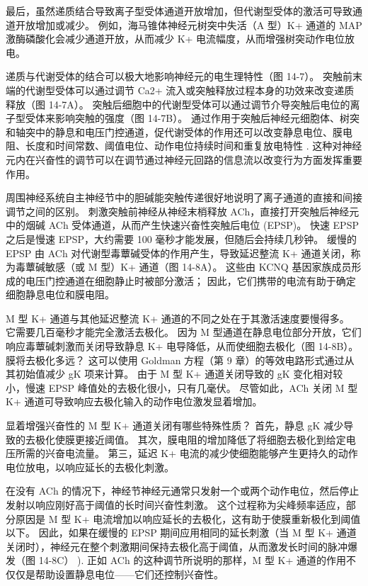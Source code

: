 最后，虽然递质结合导致离子型受体通道开放增加，但代谢型受体的激活可导致通道开放增加或减少。 例如，海马锥体神经元树突中失活（A 型）K+ 通道的 MAP 激酶磷酸化会减少通道开放，从而减少 K+ 电流幅度，从而增强树突动作电位放电。

递质与代谢受体的结合可以极大地影响神经元的电生理特性（图 14-7）。 突触前末端的代谢型受体可以通过调节 Ca2+ 流入或突触释放过程本身的功效来改变递质释放（图 14-7A）。 突触后细胞中的代谢型受体可以通过调节介导突触后电位的离子型受体来影响突触的强度（图 14-7B）。 通过作用于突触后神经元细胞体、树突和轴突中的静息和电压门控通道，促代谢受体的作用还可以改变静息电位、膜电阻、长度和时间常数、阈值电位、动作电位持续时间和重复放电特性 . 这种对神经元内在兴奋性的调节可以在调节通过神经元回路的信息流以改变行为方面发挥重要作用。

周围神经系统自主神经节中的胆碱能突触传递很好地说明了离子通道的直接和间接调节之间的区别。 刺激突触前神经从神经末梢释放 ACh，直接打开突触后神经元中的烟碱 ACh 受体通道，从而产生快速兴奋性突触后电位 (EPSP)。 快速 EPSP 之后是慢速 EPSP，大约需要 100 毫秒才能发展，但随后会持续几秒钟。 缓慢的 EPSP 由 ACh 对代谢型毒蕈碱受体的作用产生，导致延迟整流 K+ 通道关闭，称为毒蕈碱敏感（或 M 型）K+ 通道（图 14-8A）。 这些由 KCNQ 基因家族成员形成的电压门控通道在细胞静止时被部分激活； 因此，它们携带的电流有助于确定细胞静息电位和膜电阻。

M 型 K+ 通道与其他延迟整流 K+ 通道的不同之处在于其激活速度要慢得多。 它需要几百毫秒才能完全激活去极化。 因为 M 型通道在静息电位部分开放，它们响应毒蕈碱刺激而关闭导致静息 K+ 电导降低，从而使细胞去极化（图 14-8B）。 膜将去极化多远？ 这可以使用 Goldman 方程（第 9 章）的等效电路形式通过从其初始值减少 gK 项来计算。 由于 M 型 K+ 通道关闭导致的 gK 变化相对较小，慢速 EPSP 峰值处的去极化很小，只有几毫伏。 尽管如此，ACh 关闭 M 型 K+ 通道可导致响应去极化输入的动作电位激发显着增加。

显着增强兴奋性的 M 型 K+ 通道关闭有哪些特殊性质？ 首先，静息 gK 减少导致的去极化使膜更接近阈值。 其次，膜电阻的增加降低了将细胞去极化到给定电压所需的兴奋电流量。 第三，延迟 K+ 电流的减少使细胞能够产生更持久的动作电位放电，以响应延长的去极化刺激。

在没有 ACh 的情况下，神经节神经元通常只发射一个或两个动作电位，然后停止发射以响应刚好高于阈值的长时间兴奋性刺激。 这个过程称为尖峰频率适应，部分原因是 M 型 K+ 电流增加以响应延长的去极化，这有助于使膜重新极化到阈值以下。 因此，如果在缓慢的 EPSP 期间应用相同的延长刺激（当 M 型 K+ 通道关闭时），神经元在整个刺激期间保持去极化高于阈值，从而激发长时间的脉冲爆发（图 14-8C） ). 正如 ACh 的这种调节所说明的那样，M 型 K+ 通道的作用不仅仅是帮助设置静息电位——它们还控制兴奋性。

